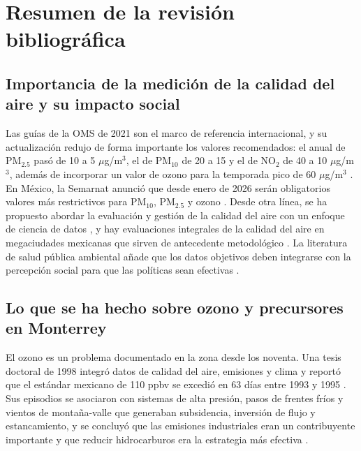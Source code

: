 \documentclass[11pt,letterpaper]{article}
\newcommand{\ugm}{$\mu$g/m$^{3}$}
\begin{document}
\section{Resumen de la revisi\'on bibliogr\'afica}

\subsection{Importancia de la medici\'on de la calidad del aire y su impacto social}
Las gu\'ias de la OMS de 2021 son el marco de referencia internacional, y su actualizaci\'on redujo de forma importante los valores recomendados: el anual de PM$_{2.5}$ pas\'o de 10 a 5 \ugm{}, el de PM$_{10}$ de 20 a 15 y el de NO$_2$ de 40 a 10 \ugm{}, adem\'as de incorporar un valor de ozono para la temporada pico de 60 \ugm{} \cite{amini2021}. En M\'exico, la Semarnat anunci\'o que desde enero de 2026 ser\'an obligatorios valores m\'as restrictivos para PM$_{10}$, PM$_{2.5}$ y ozono \cite{universal2025}. Desde otra l\'inea, se ha propuesto abordar la evaluaci\'on y gesti\'on de la calidad del aire con un enfoque de ciencia de datos \cite{represa2020}, y hay evaluaciones integrales de la calidad del aire en megaciudades mexicanas que sirven de antecedente metodol\'ogico \cite{molina2002}. La literatura de salud p\'ublica ambiental a\~nade que los datos objetivos deben integrarse con la percepci\'on social para que las pol\'iticas sean efectivas \cite{sanchez2026}.

\subsection{Lo que se ha hecho sobre ozono y precursores en Monterrey}
El ozono es un problema documentado en la zona desde los noventa. Una tesis doctoral de 1998 integr\'o datos de calidad del aire, emisiones y clima y report\'o que el est\'andar mexicano de 110 ppbv se excedi\'o en 63 d\'ias entre 1993 y 1995 \cite{martinez_repo}. Sus episodios se asociaron con sistemas de alta presi\'on, pasos de frentes fr\'ios y vientos de monta\~na-valle que generaban subsidencia, inversi\'on de flujo y estancamiento, y se concluy\'o que las emisiones industriales eran un contribuyente importante y que reducir hidrocarburos era la estrategia m\'as efectiva \cite{martinez_repo}.
\end{document}
